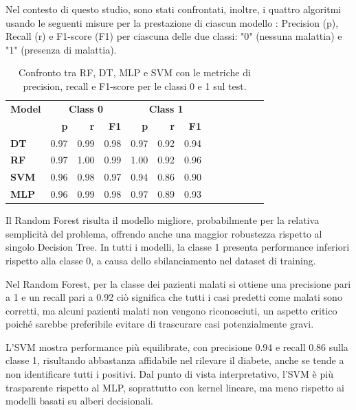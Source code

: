 \documentclass[conference]{IEEEtran}
\begin{document}
Nel contesto di questo studio, sono stati confrontati, inoltre, i quattro algoritmi usando le seguenti misure per la prestazione di ciascun modello : Precision (p), Recall (r) e F1-score (F1) per ciascuna delle due classi: "0" (nessuna malattia) e "1" (presenza di malattia).
\begin{table}[H]
\centering
\small
\begin{tabular}{l|rrr|rrr|rrr|rrr}
\toprule
\textbf{Model} & \multicolumn{3}{c|}{\textbf{Class 0}} & \multicolumn{3}{c|}{\textbf{Class 1}} \\
\cmidrule(r){2-4} \cmidrule(r){5-7}
 & \textbf{p} & \textbf{r} & \textbf{F1} & \textbf{p} & \textbf{r} & \textbf{F1} \\
\midrule
\textbf{DT} & 0.97 & 0.99 & 0.98 & 0.97 & 0.92 & 0.94 \\
\textbf{RF} & 0.97 & 1.00 & 0.99 & 1.00 & 0.92 & 0.96 \\
\textbf{SVM} & 0.96 & 0.98 & 0.97 & 0.94 & 0.86 & 0.90 \\
\textbf{MLP} & 0.96 & 0.99 & 0.98 & 0.97 & 0.89 & 0.93 \\
\bottomrule
\end{tabular}
\caption{Confronto tra RF, DT, MLP e SVM con le metriche di precision, recall e F1-score per le classi 0 e 1 sul test.}

\label{tab:classification_report_comparison_1}
\end{table}

Il Random Forest risulta il modello migliore, probabilmente per la relativa semplicità del problema, offrendo anche una maggior robustezza rispetto al singolo Decision Tree. In tutti i modelli, la classe 1 presenta performance inferiori rispetto alla classe 0, a causa dello sbilanciamento nel dataset di training.

Nel Random Forest, per la classe dei pazienti malati si ottiene una precisione pari a 1 e un recall pari a 0.92 ciò significa che tutti i casi predetti come malati sono corretti, ma alcuni pazienti malati non vengono riconosciuti, un aspetto critico poiché sarebbe preferibile evitare di trascurare casi potenzialmente gravi.

L’SVM mostra performance più equilibrate, con precisione 0.94 e recall 0.86 sulla classe 1, risultando abbastanza affidabile nel rilevare il diabete, anche se tende a non identificare tutti i positivi. Dal punto di vista interpretativo, l’SVM è più trasparente rispetto al MLP, soprattutto con kernel lineare, ma meno rispetto ai modelli basati su alberi decisionali.
\end{document}
